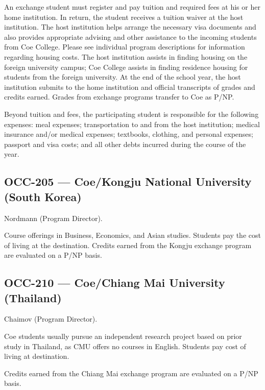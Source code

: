 \documentclass[
  letterpaper,
]{scrbook}
\begin{document}
An exchange student must register and pay tuition and required fees at
his or her home institution. In return, the student receives a tuition
waiver at the host institution. The host institution helps arrange the
necessary visa documents and also provides appropriate advising and
other assistance to the incoming students from Coe College. Please see
individual program descriptions for information regarding housing costs.
The host institution assists in finding housing on the foreign
university campus; Coe College assists in finding residence housing for
students from the foreign university. At the end of the school year, the
host institution submits to the home institution and official
transcripts of grades and credits earned. Grades from exchange programs
transfer to Coe as P/NP.

Beyond tuition and fees, the participating student is responsible for
the following expenses: meal expenses; transportation to and from the
host institution; medical insurance and/or medical expenses; textbooks,
clothing, and personal expenses; passport and visa costs; and all other
debts incurred during the course of the year.

\hypertarget{occ-205-coekongju-national-university-south-korea}{%
\subsection{OCC-205 --- Coe/Kongju National University (South
Korea)}\label{occ-205-coekongju-national-university-south-korea}}

Nordmann (Program Director).

Course offerings in Business, Economics, and Asian studies. Students pay
the cost of living at the destination. Credits earned from the Kongju
exchange program are evaluated on a P/NP basis.

\hypertarget{occ-210-coechiang-mai-university-thailand}{%
\subsection{OCC-210 --- Coe/Chiang Mai University
(Thailand)}\label{occ-210-coechiang-mai-university-thailand}}

Chaimov (Program Director).

Coe students usually pursue an independent research project based on
prior study in Thailand, as CMU offers no courses in English. Students
pay cost of living at destination.

Credits earned from the Chiang Mai exchange program are evaluated on a
P/NP basis.
\end{document}
